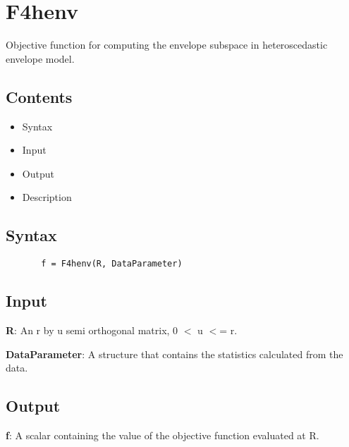 \documentclass[a4paper,11pt,openany]{memoir}
\begin{document}
\newpage

\rmfamily
\color{black}\section{F4henv}

\begin{par}
Objective function for computing the envelope subspace in heteroscedastic envelope model.
\end{par} \vspace{1em}

\subsection*{Contents}

\begin{itemize}
\setlength{\itemsep}{-1ex}
   \item Syntax
   \item Input
   \item Output
   \item Description
\end{itemize}


\subsection*{Syntax}


\begin{verbatim}       f = F4henv(R, DataParameter)\end{verbatim}
    

\subsection*{Input}

\begin{par}
\textbf{R}: An r by u semi orthogonal matrix, 0 \ensuremath{<} u \ensuremath{<}= r.
\end{par} \vspace{1em}
\begin{par}
\textbf{DataParameter}: A structure that contains the statistics calculated from the data.
\end{par} \vspace{1em}


\subsection*{Output}

\begin{par}
\textbf{f}: A scalar containing the value of the objective function evaluated at R.
\end{par} \vspace{1em}
\end{document}
